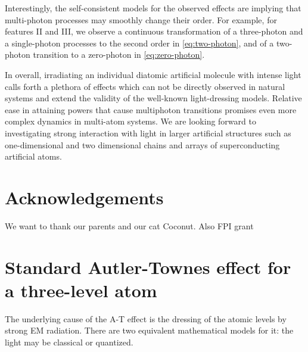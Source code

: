 \documentclass[%
 prx,
 amsmath,amssymb,
 reprint,%
]{revtex4-1}
\begin{document}
Interestingly, the self-consistent models for the observed effects are implying that multi-photon processes may smoothly change their order. For example, for features II and III, we observe a continuous transformation of a three-photon and a single-photon processes to the second order in \autoref{eq:two-photon}, and of a two-photon transition to a zero-photon in \autoref{eq:zero-photon}.

In overall, irradiating an individual diatomic artificial molecule with intense light calls forth a plethora of effects which can not be directly observed in natural systems and extend the validity of the well-known light-dressing models. Relative ease in attaining powers that cause multiphoton transitions promises even more complex dynamics in multi-atom systems. We are looking forward to investigating strong interaction with light in larger artificial structures such as one-dimensional and two dimensional chains and arrays of superconducting artificial atoms.

\section{Acknowledgements}

We want to thank our parents and our cat Coconut. Also FPI grant

\appendix

\section{Standard Autler-Townes effect for a three-level atom} \label{sec:3-level-at}

The underlying cause of the A-T effect is the dressing of the atomic levels by strong EM radiation. There are two equivalent mathematical models for it: the light may be classical or quantized.
\end{document}

